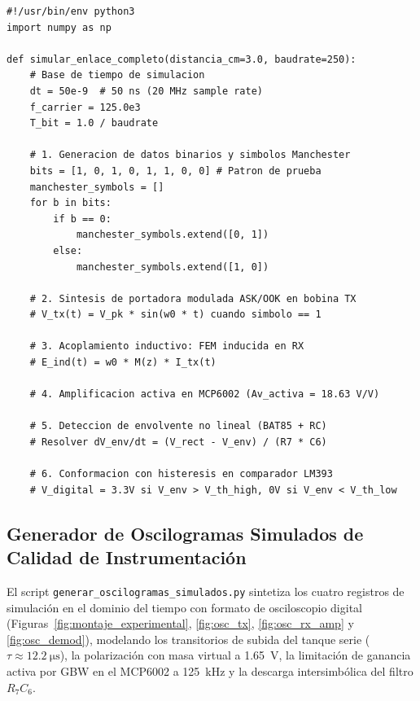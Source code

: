 \begin{lstlisting}[style=custompy, caption={Simulación dinámica temporal del enlace OOK (\texttt{informe\_ieee/datos/simular\_enlace\_datos.py})}]
#!/usr/bin/env python3
import numpy as np

def simular_enlace_completo(distancia_cm=3.0, baudrate=250):
    # Base de tiempo de simulacion
    dt = 50e-9  # 50 ns (20 MHz sample rate)
    f_carrier = 125.0e3
    T_bit = 1.0 / baudrate
    
    # 1. Generacion de datos binarios y simbolos Manchester
    bits = [1, 0, 1, 0, 1, 1, 0, 0] # Patron de prueba
    manchester_symbols = []
    for b in bits:
        if b == 0:
            manchester_symbols.extend([0, 1])
        else:
            manchester_symbols.extend([1, 0])
            
    # 2. Sintesis de portadora modulada ASK/OOK en bobina TX
    # V_tx(t) = V_pk * sin(w0 * t) cuando simbolo == 1
    
    # 3. Acoplamiento inductivo: FEM inducida en RX
    # E_ind(t) = w0 * M(z) * I_tx(t)
    
    # 4. Amplificacion activa en MCP6002 (Av_activa = 18.63 V/V)
    
    # 5. Deteccion de envolvente no lineal (BAT85 + RC)
    # Resolver dV_env/dt = (V_rect - V_env) / (R7 * C6)
    
    # 6. Conformacion con histeresis en comparador LM393
    # V_digital = 3.3V si V_env > V_th_high, 0V si V_env < V_th_low
\end{lstlisting}

\subsection{Generador de Oscilogramas Simulados de Calidad de Instrumentación}

El script \texttt{generar\_oscilogramas\_simulados.py} sintetiza los cuatro registros de simulación en el dominio del tiempo con formato de osciloscopio digital (Figuras~\ref{fig:montaje_experimental}, \ref{fig:osc_tx}, \ref{fig:osc_rx_amp} y \ref{fig:osc_demod}), modelando los transitorios de subida del tanque serie ($\tau \approx \SI{12.2}{\micro\second}$), la polarización con masa virtual a \SI{1.65}{\volt}, la limitación de ganancia activa por GBW en el MCP6002 a \SI{125}{\kilo\hertz} y la descarga intersimbólica del filtro $R_7 C_6$.

